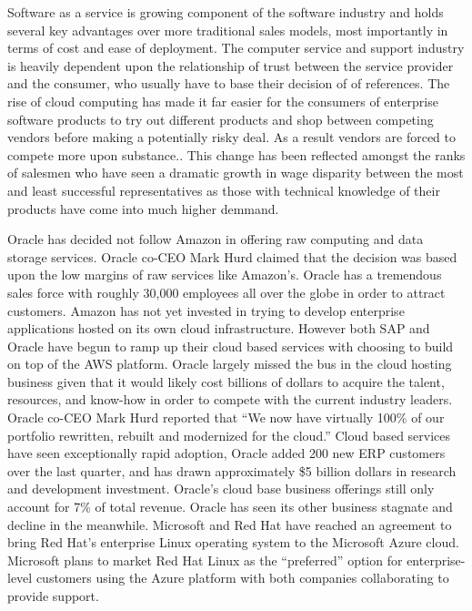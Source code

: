 Software as a service is growing component of the software industry and holds several key advantages over more traditional sales models, most importantly in terms of cost and ease of deployment.\autocite[]{GrowthTrendsSoftwareService}\autocite[]{TransitionPhaseEnterpriseApplication}
The computer service and support industry is heavily dependent upon the relationship of trust between the service provider and the consumer, who usually have to base their decision of of references.\autocite[9]{buxmann2012software}
The rise of cloud computing has made it far easier for the consumers of enterprise software products to try out different products and shop between competing vendors before making a potentially risky deal.\autocite[29]{LiquidLunch}
As a result vendors are forced to compete more upon substance.\autocite[29]{LiquidLunch}. This change has been reflected amongst the ranks of salesmen who have seen a dramatic growth in wage disparity between the most and least successful representatives as those with technical knowledge of their products have come into much higher demmand.\autocite[30]{LiquidLunch}

Oracle has decided not follow Amazon in offering raw computing and data storage services. Oracle co-CEO Mark Hurd claimed that the decision was based upon the low margins of raw services like Amazon's.\autocite[]{OracleCloudNotAWS}
Oracle has a tremendous sales force with roughly 30,000 employees all over the globe in order to attract customers.\autocite[]{OracleCloudNotAWS}
Amazon has not yet invested in trying to develop enterprise applications hosted on its own cloud infrastructure. However both SAP and Oracle have begun to ramp up their cloud based services with choosing to build on top of the AWS platform.\autocite[]{OracleCloudNotAWS}
Oracle largely missed the bus in the cloud hosting business given that it would likely cost billions of dollars to acquire the talent, resources, and know-how in order to compete with the current industry leaders.\autocite[]{OracleCloudNotAWS}
Oracle co-CEO Mark Hurd reported that ``We now have virtually 100\% of our portfolio rewritten, rebuilt and modernized for the cloud.''\autocite[]{OracleRebuilt}
Cloud based services have seen exceptionally rapid adoption, Oracle added 200 new ERP customers over the last quarter, and has drawn approximately \$5 billion dollars in research and development investment.\autocite[]{OracleRebuilt}
Oracle's cloud base business offerings still only account for 7\% of total revenue.\autocite[]{OracleNoGrowth}
Oracle has seen its other business stagnate and decline in the meanwhile.\autocite[]{OracleNoGrowth}
Microsoft and Red Hat have reached an agreement to bring Red Hat's enterprise Linux operating system to the Microsoft Azure cloud.\autocite[]{MSRHTDeal}
Microsoft plans to market Red Hat Linux as the ``preferred'' option for enterprise-level customers using the Azure platform with both companies collaborating to provide support.\autocite[]{MSRHTDeal}

